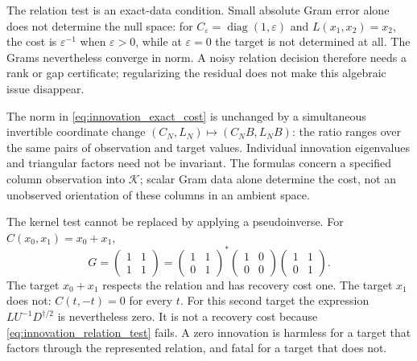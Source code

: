 \documentclass[11pt,a4paper]{amsart}
\numberwithin{equation}{section}
\theoremstyle{definition}
\theoremstyle{remark}
\DeclareMathOperator{\diag}{diag}
\begin{document}
The relation test is an exact-data condition. Small absolute Gram error alone does not determine the null space: for $C_\varepsilon=\diag(1,\varepsilon)$ and $L(x_1,x_2)=x_2$, the cost is $\varepsilon^{-1}$ when $\varepsilon>0$, while at $\varepsilon=0$ the target is not determined at all. The Grams nevertheless converge in norm. A noisy relation decision therefore needs a rank or gap certificate; regularizing the residual does not make this algebraic issue disappear.

The norm in \eqref{eq:innovation_exact_cost} is unchanged by a simultaneous invertible coordinate change $(C_N,L_N)\mapsto(C_NB,L_NB)$: the ratio ranges over the same pairs of observation and target values. Individual innovation eigenvalues and triangular factors need not be invariant. The formulas concern a specified column observation into $\mathcal K$; scalar Gram data alone determine the cost, not an unobserved orientation of these columns in an ambient space.

The kernel test cannot be replaced by applying a pseudoinverse. For $C(x_0,x_1)=x_0+x_1$,
\[
 G=\begin{pmatrix}1&1\\1&1\end{pmatrix}
 =\begin{pmatrix}1&1\\0&1\end{pmatrix}^{\!*}
   \begin{pmatrix}1&0\\0&0\end{pmatrix}
   \begin{pmatrix}1&1\\0&1\end{pmatrix}.
\]
The target $x_0+x_1$ respects the relation and has recovery cost one. The target $x_1$ does not: $C(t,-t)=0$ for every $t$. For this second target the expression $LU^{-1}D^{\dagger/2}$ is nevertheless zero. It is not a recovery cost because \eqref{eq:innovation_relation_test} fails. A zero innovation is harmless for a target that factors through the represented relation, and fatal for a target that does not.
\end{document}
